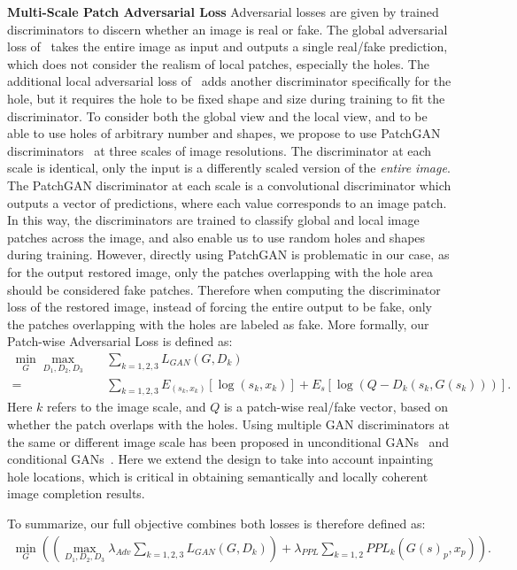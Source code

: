 \noindent\textbf{Multi-Scale Patch Adversarial Loss} Adversarial losses are given by trained discriminators to discern whether an image is real or fake. The global adversarial loss of~\cite{pathak2016context} takes the entire image as input and outputs a single real/fake prediction, which does not consider the realism of local patches, especially the holes. The additional local adversarial loss of~\cite{iizuka2017globally} adds another discriminator specifically for the hole, but it requires the hole to be fixed shape and size during training to fit the discriminator. To consider both the global view and the local view, and to be able to use holes of arbitrary number and shapes, we propose to use PatchGAN discriminators~\cite{isola2016image} at three scales of image resolutions. The discriminator at each scale is identical, only the input is a differently scaled version of the \textit{entire image}. The PatchGAN discriminator at each scale is a convolutional discriminator which outputs a vector of predictions, where each value corresponds to an image patch. In this way, the discriminators are trained to classify global and local image patches across the image, and also enable us to use random holes and shapes during training. However, directly using PatchGAN is problematic in our case, as for the output restored image, only the patches overlapping with the hole area should be considered fake patches. Therefore when computing the discriminator loss of the restored image, instead of forcing the entire output to be fake, only the patches overlapping with the holes are labeled as fake. More formally, our Patch-wise Adversarial Loss is defined as: 
\begin{eqnarray}
\min\limits_G\max\limits_{D_1, D_2, D_3}&&\sum\limits_{k=1,2,3} L_{GAN}(G,D_k)  \\ = &&\sum\limits_{k=1,2,3}E_{(s_k,x_k)}[\log (s_k,x_k)] + E_s[\log (Q-D_k(s_k,G(s_k)))].
\end{eqnarray}
\label{eqn:adversarial_loss}
Here $k$ refers to the image scale, and $Q$ is a patch-wise real/fake vector, based on whether the patch overlaps with the holes. Using multiple GAN discriminators at the same or different image scale has been proposed in unconditional GANs~\cite{durugkar2016generative} and conditional GANs~\cite{wang2017high}. Here we extend the design to take into account inpainting hole locations, which is critical in obtaining semantically and locally coherent image completion results.

To summarize, our full objective combines both losses is therefore defined as:
\begin{eqnarray}
\min\limits_G((\max\limits_{D_1, D_2, D_3}\lambda_{Adv}\sum\limits_{k=1,2,3} L_{GAN}(G,D_k))+\lambda_{PPL}\sum\limits_{k=1,2}PPL_k(G(s)_p, x_p)).
\end{eqnarray}

